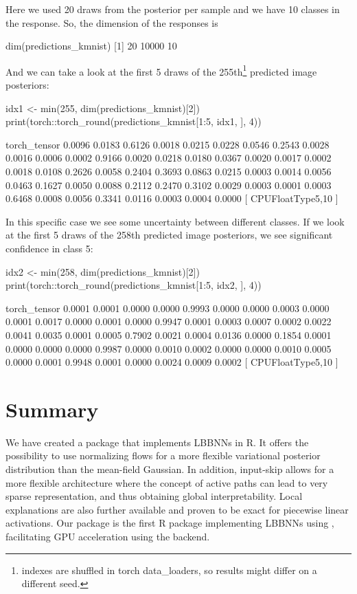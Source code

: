 Here we used 20 draws from the posterior per sample and we have 10 classes in the response. So, the dimension of the responses is 
\begin{example}
dim(predictions_kmnist)
[1]    20 10000    10
\end{example}
And we can take a look at the first 5 draws of the 255th\footnote{indexes are shuffled in torch data\_loaders, so results might differ on a different seed.} predicted image posteriors:
\begin{example}
idx1 <- min(255, dim(predictions_kmnist)[2])
print(torch::torch_round(predictions_kmnist[1:5, idx1, ], 4))

torch_tensor
 0.0096  0.0183  0.6126  0.0018  0.0215  0.0228  0.0546  0.2543  0.0028  0.0016
 0.0006  0.0002  0.9166  0.0020  0.0218  0.0180  0.0367  0.0020  0.0017  0.0002
 0.0018  0.0108  0.2626  0.0058  0.2404  0.3693  0.0863  0.0215  0.0003  0.0014
 0.0056  0.0463  0.1627  0.0050  0.0088  0.2112  0.2470  0.3102  0.0029  0.0003
 0.0001  0.0003  0.6468  0.0008  0.0056  0.3341  0.0116  0.0003  0.0004  0.0000
[ CPUFloatType{5,10} ]
\end{example}

In this specific case we see some uncertainty between different classes. If we look at the first 5 draws of the 258th predicted image posteriors, we see significant confidence in class 5:

\begin{example}
idx2 <- min(258, dim(predictions_kmnist)[2])
print(torch::torch_round(predictions_kmnist[1:5, idx2, ], 4))

torch_tensor
 0.0001  0.0001  0.0000  0.0000  0.9993  0.0000  0.0000  0.0003  0.0000  0.0001
 0.0017  0.0000  0.0001  0.0000  0.9947  0.0001  0.0003  0.0007  0.0002  0.0022
 0.0041  0.0035  0.0001  0.0005  0.7902  0.0021  0.0004  0.0136  0.0000  0.1854
 0.0001  0.0000  0.0000  0.0000  0.9987  0.0000  0.0010  0.0002  0.0000  0.0000
 0.0010  0.0005  0.0000  0.0001  0.9948  0.0001  0.0000  0.0024  0.0009  0.0002
[ CPUFloatType{5,10} ]
\end{example}

\section{Summary}
We have created a package that implements LBBNNs in R. It offers the possibility to use normalizing flows for a more flexible variational posterior distribution than the mean-field Gaussian. In addition, input-skip allows for a more flexible architecture where the concept of active paths can lead to very sparse representation, and thus obtaining global interpretability. Local explanations are also further available and proven to be exact for piecewise linear activations. Our package is the first R package implementing LBBNNs using , facilitating GPU acceleration using the  backend. 

